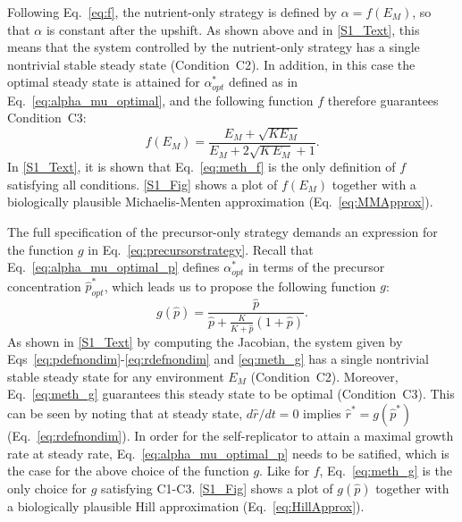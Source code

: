 Following Eq.~\ref{eq:f}, the nutrient-only strategy is defined by $\alpha = f(E_M)$, so that $\alpha$ is constant after the upshift.
As shown above and in \ref{S1_Text}, this means that the system controlled by the nutrient-only strategy has a single nontrivial stable steady state (Condition~C2). 
In addition, in this case the optimal steady state is attained for $\alpha^*_{opt}$ defined as in Eq.~\ref{eq:alpha_mu_optimal}, and the following function $f$ therefore guarantees Condition~C3:
\begin{equation}
\label{eq:meth_f}
f(E_M) = \frac{E_M + \sqrt{K E_M}}{E_M + 2\sqrt{K\, E_M} + 1}.
\end{equation}
In \ref{S1_Text}, it is shown that Eq.~\ref{eq:meth_f} is the only definition of $f$ satisfying all conditions.
\ref{S1_Fig} shows a plot of $f(E_M)$ together with a biologically plausible Michaelis-Menten approximation (Eq.~\ref{eq:MMApprox}).

The full specification of the precursor-only strategy demands an expression for the function $g$ in Eq.~\ref{eq:precursorstrategy}.
Recall that Eq.~\ref{eq:alpha_mu_optimal_p} defines $\alpha_{opt}^*$ in terms of the precursor concentration $\hat{p}_{opt}^*$, which leads us to propose the following function $g$:
\begin{equation}
\label{eq:meth_g}
g(\hat{p}) = \frac{\hat{p}}{\hat{p} + \frac{K}{K + \hat{p}}(1+\hat{p})}.
\end{equation}
As shown in \ref{S1_Text} by computing the Jacobian, the system given by Eqs~\ref{eq:pdefnondim}-\ref{eq:rdefnondim} and \ref{eq:meth_g} has a single nontrivial stable steady state for any environment $E_M$ (Condition~C2).
Moreover, Eq.~\ref{eq:meth_g} guarantees this steady state to be optimal (Condition~C3).
This can be seen by noting that at steady state, $d\hat{r}/dt=0$ implies $\hat{r}^*=g(\hat{p}^*)$ (Eq.~\ref{eq:rdefnondim}).
In order for the self-replicator to attain a maximal growth rate at steady rate, Eq.~\ref{eq:alpha_mu_optimal_p} needs to be satified, which is the case for the above choice of the function $g$.
Like for $f$, Eq.~\ref{eq:meth_g} is the only choice for $g$ satisfying C1-C3.
\ref{S1_Fig} shows a plot of $g(\hat{p})$ together with a biologically plausible Hill approximation (Eq.~\ref{eq:HillApprox}).

